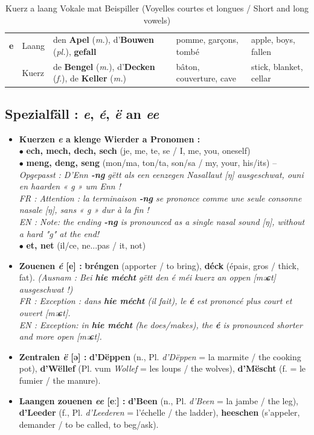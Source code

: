 \begin{table}[htbp]
\begin{tabular}{cl p{3.8cm} p{3.8cm} p{3.8cm}}
        \midrule
        \textbf{e} & Laang & den \textbf{Apel} (\textit{m.}), d'\textbf{Bouwen} (\textit{pl.}), \textbf{gefall} & pomme, garçons, tombé & apple, boys, fallen \\
        & Kuerz & de \textbf{Bengel} (\textit{m.}), d'\textbf{Decken} (\textit{f.}), de \textbf{Keller} (\textit{m.}) & bâton, couverture, cave & stick, blanket, cellar \\
        \bottomrule
    \end{tabular}
    \caption{Kuerz a laang Vokale mat Beispiller (Voyelles courtes et longues / Short and long vowels)}
\end{table}

\subsection{Spezialfäll : \textit{e}, \textit{é}, \textit{ë} an \textit{ee}}

\begin{itemize}
    \item \textbf{Kuerzen \textit{e} a klenge Wierder a Pronomen :} \\
    $\bullet$ \textbf{ech, mech, dech, sech} (je, me, te, se / I, me, you, oneself) \\
    $\bullet$ \textbf{meng, deng, seng} (mon/ma, ton/ta, son/sa / my, your, his/its) -- \textit{Opgepasst : D'Enn \textbf{-ng} gëtt als een eenzegen Nasallaut {[ŋ]} ausgeschwat, ouni en haarden « g » um Enn !} \\
    \textit{FR : Attention : la terminaison \textbf{-ng} se prononce comme une seule consonne nasale {[ŋ]}, sans « g » dur à la fin !} \\
    \textit{EN : Note: the ending \textbf{-ng} is pronounced as a single nasal sound {[ŋ]}, without a hard "g" at the end!} \\
    $\bullet$ \textbf{et, net} (il/ce, ne...pas / it, not)
    \item \textbf{Zouenen \textit{é} {[e]} :} \textbf{bréngen} (apporter / to bring), \textbf{déck} (épais, gros / thick, fat). \textit{(Ausnam : Bei \textbf{hie mécht} gëtt den \textit{é} méi kuerz an oppen {[məɕt]} ausgeschwat !)} \\
    \textit{FR : Exception : dans \textbf{hie mécht} (il fait), le \textbf{é} est prononcé plus court et ouvert {[məɕt]}.} \\
    \textit{EN : Exception: in \textbf{hie mécht} (he does/makes), the \textbf{é} is pronounced shorter and more open {[məɕt]}.}
    \item \textbf{Zentralen \textit{ë} {[ə]} :} \textbf{d'Dëppen} (n., Pl. \textit{d'Dëppen} = la marmite / the cooking pot), \textbf{d'Wëllef} (Pl. vum \textit{Wollef} = les loups / the wolves), \textbf{d'Mëscht} (f. = le fumier / the manure).
    \item \textbf{Laangen zouenen \textit{ee} {[eː]} :} \textbf{d'Been} (n., Pl. \textit{d'Been} = la jambe / the leg), \textbf{d'Leeder} (f., Pl. \textit{d'Leederen} = l'échelle / the ladder), \textbf{heeschen} (s'appeler, demander / to be called, to beg/ask).
\end{itemize}

